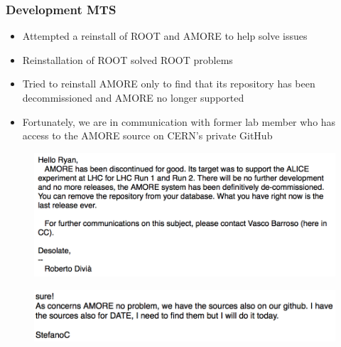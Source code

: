 \documentclass[aspectratio=169]{beamer}
\begin{document}
\begin{frame}

  \frametitle{Development MTS}

  \begin{itemize}
    \item Attempted a reinstall of ROOT and AMORE to help solve issues
    \item Reinstallation of ROOT solved ROOT problems
    \item Tried to reinstall AMORE only to find that its repository has been
      decommissioned and AMORE no longer supported
    \item Fortunately, we are in communication with former lab member who has
      access to the AMORE source on CERN's private GitHub
  \end{itemize}

  \begin{multicols}{2}
    
    \begin{figure}[H]
      \begin{center}
        \includegraphics[scale=0.4]{AMOREGoneEmail.png}
      \end{center}
    \end{figure}
    
    \columnbreak

    \begin{figure}[H]
      \begin{center}
        \includegraphics[scale=0.4]{StefanoEmail.png}
      \end{center}
    \end{figure}

  \end{multicols}

\end{frame}
\end{document}
